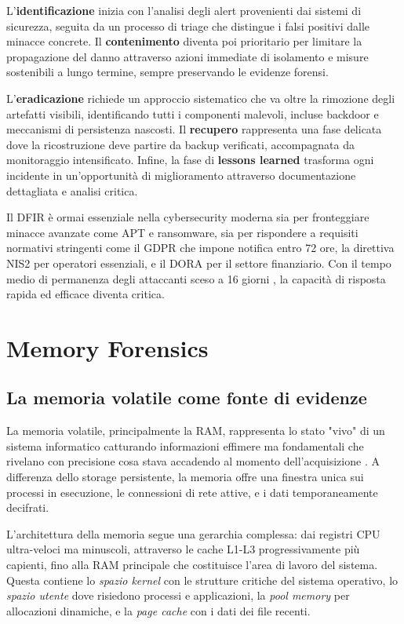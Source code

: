 L'\textbf{identificazione} inizia con l'analisi degli alert provenienti dai sistemi di sicurezza, seguita da un processo di triage che distingue i falsi positivi dalle minacce concrete. Il \textbf{contenimento} diventa poi prioritario per limitare la propagazione del danno attraverso azioni immediate di isolamento e misure sostenibili a lungo termine, sempre preservando le evidenze forensi.

L'\textbf{eradicazione} richiede un approccio sistematico che va oltre la rimozione degli artefatti visibili, identificando tutti i componenti malevoli, incluse backdoor e meccanismi di persistenza nascosti. Il \textbf{recupero} rappresenta una fase delicata dove la ricostruzione deve partire da backup verificati, accompagnata da monitoraggio intensificato. Infine, la fase di \textbf{lessons learned} trasforma ogni incidente in un'opportunità di miglioramento attraverso documentazione dettagliata e analisi critica.

Il DFIR è ormai essenziale nella cybersecurity moderna sia per fronteggiare minacce avanzate come APT e ransomware, sia per rispondere a requisiti normativi stringenti come il GDPR \cite{gdpr2016} che impone notifica entro 72 ore, la direttiva NIS2 \cite{nis2_2022} per operatori essenziali, e il DORA \cite{dora2022} per il settore finanziario. Con il tempo medio di permanenza degli attaccanti sceso a 16 giorni \cite{mandiant2023}, la capacità di risposta rapida ed efficace diventa critica.

\section{Memory Forensics}

\subsection{La memoria volatile come fonte di evidenze}

La memoria volatile, principalmente la RAM, rappresenta lo stato "vivo" di un sistema informatico catturando informazioni effimere ma fondamentali che rivelano con precisione cosa stava accadendo al momento dell'acquisizione \cite{ligh2014}. A differenza dello storage persistente, la memoria offre una finestra unica sui processi in esecuzione, le connessioni di rete attive, e i dati temporaneamente decifrati.

L'architettura della memoria segue una gerarchia complessa: dai registri CPU ultra-veloci ma minuscoli, attraverso le cache L1-L3 progressivamente più capienti, fino alla RAM principale che costituisce l'area di lavoro del sistema. Questa contiene lo \textit{spazio kernel} con le strutture critiche del sistema operativo, lo \textit{spazio utente} dove risiedono processi e applicazioni, la \textit{pool memory} per allocazioni dinamiche, e la \textit{page cache} con i dati dei file recenti.

